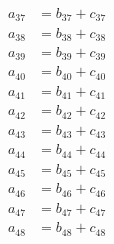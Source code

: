 \begin{align}
  a_{37} &= b_{37} + c_{37} \\
  a_{38} &= b_{38} + c_{38} \\
  a_{39} &= b_{39} + c_{39} \\
  a_{40} &= b_{40} + c_{40} \\
  a_{41} &= b_{41} + c_{41} \\
  a_{42} &= b_{42} + c_{42} \\
  a_{43} &= b_{43} + c_{43} \\
  a_{44} &= b_{44} + c_{44} \\
  a_{45} &= b_{45} + c_{45} \\
  a_{46} &= b_{46} + c_{46} \\
  a_{47} &= b_{47} + c_{47} \\
  a_{48} &= b_{48} + c_{48}\label{eq:last-row}
\end{align}
